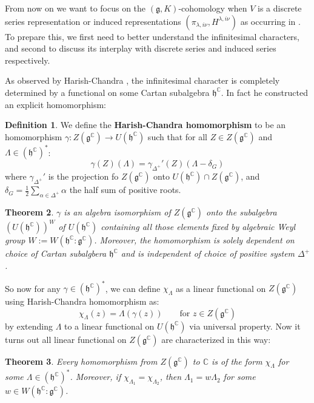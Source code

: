 \documentclass[11pt]{report}
\theoremstyle{definition}
\newtheorem{Def}{Definition}[chapter]
\theoremstyle{plain}
\newtheorem{Theo}[Def]{Theorem}
\newcommand{\complex}{\mathbb{C}}
\newcommand{\Lie}[1]{\mathfrak{#1}}
\begin{document}
From now on we want to focus on the $(\Lie{g},K)$-cohomology when $V$ is a discrete series representation or induced representations $(\pi_{\lambda, i\nu}, H^{\lambda, i\nu})$ as occurring in . To prepare this, we first need to better understand the infinitesimal characters, and second to discuss its interplay with discrete series and induced series respectively.
\par As observed by Harish-Chandra \cite{harish1951}, the infinitesimal character is completely determined by a functional on some Cartan subalgebra $\Lie{h}^\complex$. In fact he constructed an explicit homomorphism: 
\begin{Def}\label{knapp(8.24)}
	We define the \textbf{Harish-Chandra homomorphism} to be an homomorphism $\gamma:Z(\Lie{g}^\complex)\to U(\Lie{h}^\complex)$ such that for all $Z\in Z(\Lie{g}^\complex)$ and $\Lambda\in (\Lie{h}^\complex)^*$:
	\begin{equation}
	\gamma(Z)(\Lambda)=\gamma_{\Delta^+}'(Z)(\Lambda-\delta_G)
	\end{equation}
	where $\gamma_{\Delta^+}'$ is the projection fo $Z(\Lie{g}^\complex)$ onto $U(\Lie{h}^\complex)\cap Z(\Lie{g}^\complex)$, and $\delta_G=\frac{1}{2}\sum_{\alpha\in\Delta^+}^{}\alpha$ the half sum of positive roots.
\end{Def}
\begin{Theo}\label{knapp8.18}
	\textnormal{\cite[Theorem~8.18]{knapp2016}} $\gamma$ is an algebra isomorphism of $Z(\Lie{g}^\complex)$ onto the subalgebra $(U(\Lie{h}^\complex))^W$ of $U(\Lie{h}^\complex)$ containing all those elements fixed by algebraic Weyl group $W:=W(\Lie{h}^\complex:\Lie{g}^\complex)$. Moreover, the homomorphism is solely dependent on choice of Cartan subalgbera $\Lie{h}^\complex$ and is independent of choice of positive system $\Delta^+$.
\end{Theo}
So now for any $\gamma\in (\Lie{h}^\complex)^*$, we can define $\chi_{\Lambda}$ as a linear functional on $Z(\Lie{g}^\complex)$ using Harish-Chandra homomorphism as:
\begin{equation}
\chi_{\Lambda}(z)=\Lambda(\gamma(z)) \qquad \text{for $z\in Z(\Lie{g}^\complex)$}
\end{equation}
by extending $\Lambda$ to a linear functional on $U(\Lie{h}^\complex)$ via universal property. Now it turns out all linear functional on $Z(\Lie{g}^\complex)$ are characterized in this way:
\begin{Theo}
	\textnormal{\cite[Proposition~8.20 \& 8.21]{knapp2016}} Every homomorphism from $Z(\Lie{g}^\complex)$ to $\complex$ is of the form $\chi_{\Lambda}$ for some $\Lambda\in (\Lie{h}^\complex)^*$. Moreover, if $\chi_{\Lambda_1}=\chi_{\Lambda_2}$, then $\Lambda_1=w\Lambda_2$ for some $w\in W(\Lie{h}^\complex: \Lie{g}^\complex)$.
\end{Theo}
\end{document}
